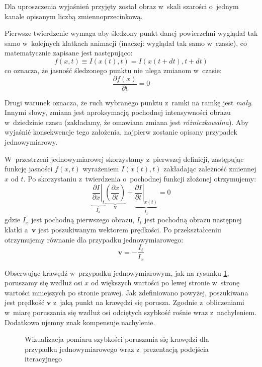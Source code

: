     Dla uproszczenia wyjaśnień przyjęty został obraz w~skali szarości o~jednym kanale opisanym liczbą zmiennoprzecinkową.

    Pierwsze twierdzenie wymaga aby śledzony punkt danej powierzchni wyglądał tak samo w~kolejnych klatkach animacji (inaczej: wyglądał tak samo w~czasie), co matematycznie zapisane jest następująco: \[ f(x, t) \equiv I(x(t), t) = I(x(t + dt), t + dt) \] co oznacza, że jasność śledzonego punktu nie ulega zmianom w~czasie: \[ \frac{\partial f(x)}{\partial t} = 0 \]

    Drugi warunek oznacza, że ruch wybranego punktu z~ramki na ramkę jest \textit{mały}. Innymi słowy, zmiana jest aproksymacją pochodnej intensywności obrazu w~dziedzinie czasu (zakładamy, że omawiana zmiana jest \textit{różniczkowalna}). Aby wyjaśnić konsekwencje tego założenia, najpierw zostanie opisany przypadek jednowymiarowy.

    W~przestrzeni jednowymiarowej skorzystamy z~pierwszej definicji, zastępując funkcję jasności $f(x,t)$ wyrażeniem $I(x(t), t)$ zakładając zależność zmiennej $x$ od $t$. Po skorzystaniu z~twierdzenia o~pochodnej funkcji złożonej otrzymujemy: \[ \underbrace{ \left. \frac{\partial I}{\partial x}\right|_{t} }_{I_{x}} \underbrace{ \left(\frac{\partial x}{\partial t}\right) }_{\mathbf{v}} + \underbrace{ \left. \frac{\partial I}{\partial t}\right|_{x(t)} }_{I_{t}} = 0 \] gdzie $I_{x}$ jest pochodną pierwszego obrazu, $I_{t}$ jest pochodną obrazu następnej klatki a~$\mathbf{v}$ jest poszukiwanym wektorem prędkości. Po przekształceniu otrzymujemy równanie dla przypadku jednowymiarowego: \[ \mathbf{v} = -\frac{I_{t}}{I_{x}} \]

    Obserwując krawędź w~przypadku jednowymiarowym, jak na rysunku \ref{fig:EdgeVelocity1D}, poruszamy się wzdłuż osi $x$ od większych wartości po lewej stronie w~stronę wartości mniejszych po stronie prawej. Jak zdefiniowano powyżej, poszukiwana jest prędkość $\mathbf{v}$ z~jaką punkt na krawędzi się porusza. Zgodnie z~obliczeniami w~miarę poruszania się wzdłuż osi odciętych szybkość rośnie wraz z~nachyleniem. Dodatkowo ujemny znak kompensuje nachylenie.

    \begin{figure}[!ht]
      \centering
      \caption[Wizualizacja pomiaru szybkości poruszania się krawędzi dla przypadku jednowymiarowego]{Wizualizacja pomiaru szybkości poruszania się krawędzi dla przypadku jednowymiarowego wraz z~prezentacją podejścia iteracyjnego}
      \label{fig:EdgeVelocity1D}
    \end{figure}

